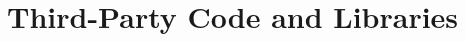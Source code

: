 \chapter{Third-Party Code and Libraries}
\begin{comment}
If you have made use of any third party code or software libraries, i.e. any code that you have not designed and written yourself, then you must include this appendix. 

As has been said in lectures, it is acceptable and likely that you will make use of third-party code and software libraries. If third party code or libraries are used, your work will build on that to produce notable new work. The key requirement is that we understand what your original work is and what work is based on that of other people. 

Therefore, you need to clearly state what you have used and where the original material can be found. Also, if you have made any changes to the original versions, you must explain what you have changed. 

The following is an example of what you might say. 

Apache POI library - The project has been used to read and write Microsoft Excel files (XLS) as part of the interaction with the client's existing system for processing data. Version 3.10-FINAL was used. The library is open source and it is available from the Apache Software Foundation 
\cite{apache_poi}. The library is released using the Apache License 
\cite{apache_license}. This library was used without modification. 

Include as many declarations as appropriate for your work. The specific wording is less important than the fact that you are declaring the relevant work.
\end{comment}